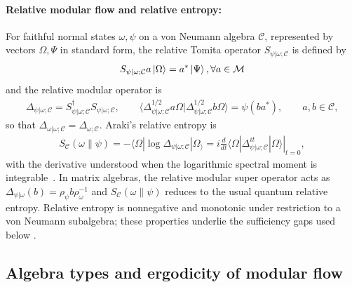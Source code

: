 \documentclass[a4paper,11pt]{article}
\theoremstyle{definition}
\newcommand{\mM}{\mathcal{M}}
\begin{document}
\paragraph{Relative modular flow and relative entropy:}
For faithful normal states $\omega,\psi$ on a von Neumann algebra $\mathcal C$, represented by vectors $\Omega,\Psi$ in standard form, the relative Tomita operator $S_{\psi|\omega;\mathcal C}$ is defined by
\begin{align}
 S_{\psi|\omega;\mathcal C} a\ket{\Omega}=a^*\ket{\Psi},  \forall a\in\mM
\end{align}
and the relative modular operator is
\begin{align}
 \Delta_{\psi|\omega;\mathcal C}=S_{\psi|\omega;\mathcal C}^\dagger S_{\psi|\omega;\mathcal C},
 \qquad
 \langle\Delta_{\psi|\omega;\mathcal C}^{1/2}a\Omega|\Delta_{\psi|\omega;\mathcal C}^{1/2}b\Omega\rangle=\psi(ba^*),\qquad a,b\in\mathcal C,
 \label{eq:relative-modular}
\end{align}
so that $\Delta_{\omega|\omega;\mathcal C}=\Delta_{\omega;\mathcal C}$. Araki's relative entropy is
\begin{align}
 S_{\mathcal C}(\omega\|\psi)
 =-\langle\Omega|\log\Delta_{\psi|\omega;\mathcal C}|\Omega_\rangle
 =i\left.\frac{d}{dt}\langle\Omega|\Delta_{\psi|\omega;\mathcal C}^{it}|\Omega\rangle\right|_{t=0},
 \label{eq:relative-entropy}
\end{align}
with the derivative understood when the logarithmic spectral moment is integrable~\cite{Araki1976,Araki1977}. In matrix algebras, the relative modular super operator acts as  $\Delta_{\psi|\omega}(b)=\rho_\psi b \rho_\omega^{-1}$ and $S_{\mathcal C}(\omega\|\psi)$ reduces to the usual quantum relative entropy. Relative entropy is nonnegative and monotonic under restriction to a von Neumann subalgebra; these properties underlie the sufficiency gaps used below \cite{Araki1976}.

\subsection{Algebra types and ergodicity of modular flow}\label{subsec:types-modular}
\end{document}

